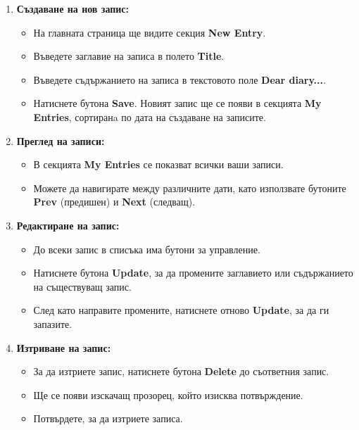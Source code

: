 \documentclass[12pt]{article}
\begin{document}
\begin{enumerate}
    \item \textbf{Създаване на нов запис:}
    \begin{itemize}
        \item На главната страница ще видите секция \textbf{New Entry}.
        \item Въведете заглавие на записа в полето \textbf{Title}.
        \item Въведете съдържанието на записа в текстовото поле \textbf{Dear diary...}.
        \item Натиснете бутона \textbf{Save}. Новият запис ще се появи в секцията \textbf{My Entries}, сортиранa по дата на създаване на записите.
    \end{itemize}
    
    \item \textbf{Преглед на записи:}
    \begin{itemize}
        \item В секцията \textbf{My Entries} се показват всички ваши записи.
        \item Можете да навигирате между различните дати, като използвате бутоните \textbf{Prev} (предишен) и \textbf{Next} (следващ).
    \end{itemize}
    
    \item \textbf{Редактиране на запис:}
    \begin{itemize}
        \item До всеки запис в списъка има бутони за управление.
        \item Натиснете бутона \textbf{Update}, за да промените заглавието или съдържанието на съществуващ запис.
        \item След като направите промените, натиснете отново \textbf{Update}, за да ги запазите.
    \end{itemize}

    \item \textbf{Изтриване на запис:}
    \begin{itemize}
        \item За да изтриете запис, натиснете бутона \textbf{Delete} до съответния запис.
        \item Ще се появи изскачащ прозорец, който изисква потвърждение.
        \item Потвърдете, за да изтриете записа.
    \end{itemize}
\end{enumerate}
\end{document}

